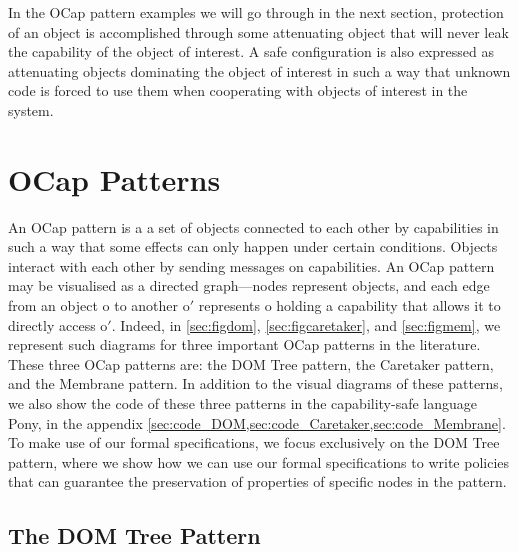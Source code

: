 \documentclass[a4paper,11pt,twoside]{article}
\begin{document}
In the OCap pattern examples we will go through in the next section, protection of an object is accomplished through some attenuating object that will never leak the capability of the object of interest. A safe configuration is also expressed as attenuating objects dominating the object of interest in such a way that unknown code is forced to use them when cooperating with objects of interest in the system.

\newpage
\section{OCap Patterns}\label{sec:ocappatterns}

An OCap pattern is a a set of objects connected to each other by capabilities in such a way that some effects can only happen under certain conditions. Objects interact with each other by sending messages on capabilities. An OCap pattern may be visualised as a directed graph---nodes represent objects, and each edge from an object o to another o$'$ represents o holding a capability that allows it to directly access o$'$. Indeed, in \cref{sec:figdom}, \cref{sec:figcaretaker}, and \cref{sec:figmem}, we represent such diagrams for three important OCap patterns in the literature. These three OCap patterns are: the DOM Tree pattern, the Caretaker pattern, and the Membrane pattern. In addition to the visual diagrams of these patterns, we also show the code of these three patterns in the capability-safe language Pony\cite{clebsch2015}, in the appendix \cref{sec:code_DOM,sec:code_Caretaker,sec:code_Membrane}. To make use of our formal specifications, we focus exclusively on the DOM Tree pattern, where we show how we can use our formal specifications to write policies that can guarantee the preservation of properties of specific nodes in the pattern.

\subsection{The DOM Tree Pattern}
\end{document}
